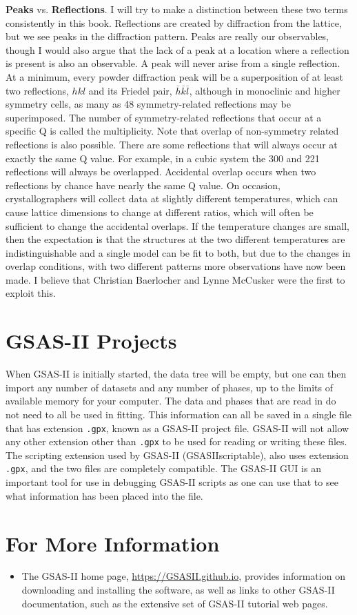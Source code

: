 \textbf{Peaks} vs. \textbf{Reflections}. I will try to make a distinction between these two terms consistently in this book. Reflections are created by diffraction from the lattice, but we see peaks in the diffraction pattern. Peaks are really our observables, though I would also argue that the lack of a peak at a location where a reflection is present is also an observable. A peak will never arise from a single reflection. At a minimum, every powder diffraction peak will be a superposition of at least two reflections, $hkl$ and its Friedel pair, $\overline{h}\overline{k}\overline{l}$, although in monoclinic and higher symmetry cells, as many as 48 symmetry-related reflections may be superimposed. The number of symmetry-related reflections that occur at a specific Q is called the multiplicity. Note that  overlap of non-symmetry related reflections is also possible. There are some reflections that will always occur at exactly the same Q value. For example, in a cubic system the 300 and 221 reflections will always be overlapped. Accidental overlap occurs when two reflections by chance have nearly the same Q value. On occasion, crystallographers will collect data at slightly different temperatures, which can cause lattice dimensions to change at different ratios, which will often be sufficient to change the accidental overlaps. If the temperature changes are small, then the expectation is that the structures at the two different temperatures are indistinguishable and a single model can be fit to both, but due to the changes in overlap conditions, with two different patterns more observations have now been made.  I believe that Christian Baerlocher and Lynne McCusker were the first to exploit this.

\section{GSAS-II Projects}
When GSAS-II is initially started, the data tree will be empty, but one can then import any number of datasets and any number of phases, up to the limits of available memory for your computer. The data and phases that are read in do not need to all be used in fitting. This information can all be saved in a single file that has extension \texttt{.gpx}, known as a GSAS-II project file. GSAS-II will not allow any other extension other than \texttt{.gpx} to be used for reading or writing these files. The scripting extension used by GSAS-II (GSASIIscriptable), also uses extension \texttt{.gpx}, and the two files are completely compatible. The GSAS-II GUI is an important tool for use in debugging GSAS-II scripts as one can use that to see what information has been placed into the file. 


\section{For More Information}

\begin{itemize}
\item The GSAS-II home page, \url{https://GSASII.github.io}, provides information on downloading and installing the software, as well as links to other GSAS-II documentation, such as the extensive set of GSAS-II tutorial web pages. 
\end{itemize}
